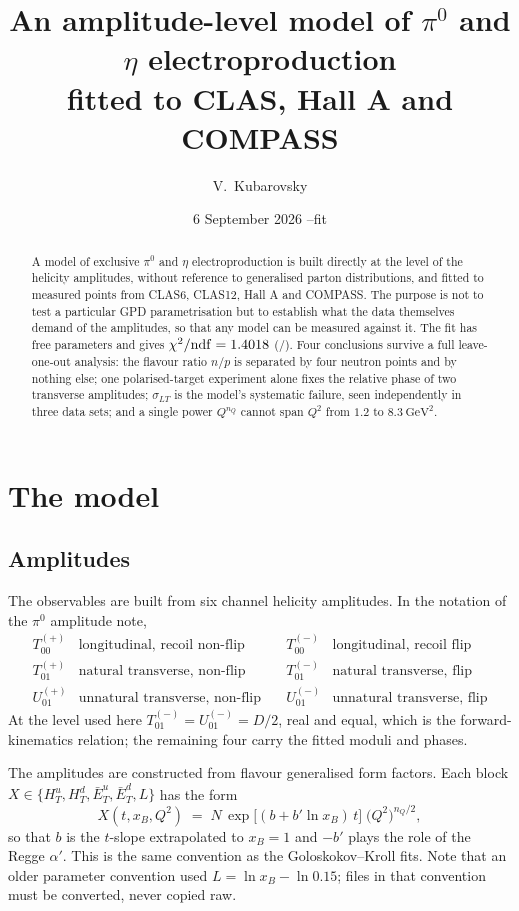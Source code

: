 \documentclass[11pt,a4paper]{article}
\title{An amplitude-level model of $\pi^0$ and $\eta$ electroproduction\\
       fitted to CLAS, Hall A and COMPASS}
\author{V.\ Kubarovsky}
\date{6 September 2026 \quad--\quad fit \texttt{\fittag}}
\newcommand{\sig}[1]{\sigma_{#1}}
\begin{document}
\maketitle

\begin{abstract}
\noindent
A model of exclusive $\pi^0$ and $\eta$ electroproduction is built directly at
the level of the helicity amplitudes, without reference to generalised parton
distributions, and fitted to \nfit{} measured points from CLAS6, CLAS12,
Hall A and COMPASS.  The purpose is not to test a particular GPD
parametrisation but to establish what the data themselves demand of the
amplitudes, so that any model can be measured against it.  The fit has \npar{}
free parameters and gives $\chi^2/\mathrm{ndf} = 1.4018$ (\chitot/\ndf).
Four conclusions survive a full leave-one-out analysis: the flavour ratio
$n/p$ is separated by four neutron points and by nothing else; one
polarised-target
experiment alone fixes the relative phase of two transverse amplitudes;
$\sig{LT}$ is the model's systematic failure, seen independently in three data
sets; and a single power $Q^{n_Q}$ cannot span $Q^2$ from $1.2$ to
$8.3\ \mathrm{GeV}^2$.
\end{abstract}

\section{The model}

\subsection{Amplitudes}

The observables are built from six channel helicity amplitudes.  In the
notation of the $\pi^0$ amplitude note,
\[
\begin{array}{llll}
T_{00}^{(+)} & \text{longitudinal, recoil non-flip} &\quad
T_{00}^{(-)} & \text{longitudinal, recoil flip}\\
T_{01}^{(+)} & \text{natural transverse, non-flip} &\quad
T_{01}^{(-)} & \text{natural transverse, flip}\\
U_{01}^{(+)} & \text{unnatural transverse, non-flip} &\quad
U_{01}^{(-)} & \text{unnatural transverse, flip}
\end{array}
\]
At the level used here $T_{01}^{(-)} = U_{01}^{(-)} = D/2$, real and equal,
which is the forward-kinematics relation; the remaining four carry the fitted
moduli and phases.

The amplitudes are constructed from flavour generalised form factors.  Each
block $X \in \{H_T^u, H_T^d, \bar E_T^u, \bar E_T^d, L\}$ has the form
\begin{equation}
X(t, x_B, Q^2) \;=\; N \,
\exp\!\big[(b + b' \ln x_B)\, t\big]\;
\big(Q^2\big)^{n_Q/2},
\label{eq:gff}
\end{equation}
so that $b$ is the $t$-slope extrapolated to $x_B = 1$ and $-b'$ plays the role
of the Regge $\alpha'$.  This is the same convention as the Goloskokov--Kroll
fits.  Note that an older parameter convention used
$L = \ln x_B - \ln 0.15$; files in that convention must be converted, never
copied raw.
\end{document}
